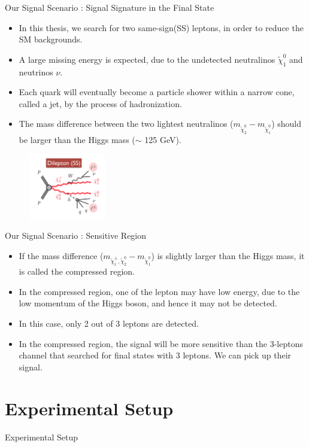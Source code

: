 \documentclass[mathserif,serif]{beamer}
\begin{document}
\begin{frame}{Our Signal Scenario : Signal Signature in the Final State}
\begin{itemize}
\item In this thesis, we search for two same-sign(SS) leptons, in order to reduce the SM backgrounds.
\item A large missing energy is expected, due to the undetected neutralinos $\tilde{\chi}_1^0$ and neutrinos $\nu$.
\item Each quark will eventually become a particle shower within a narrow cone, called a jet, by the process of hadronization.
\item The mass difference between the two lightest neutralinos ($m_{\tilde{\chi}_2^0} - m_{\tilde{\chi}_1^0}$) should be larger than the Higgs mass ($\sim$ 125 GeV).
\end{itemize}
\begin{figure}
\centering
\includegraphics[width=0.3\textwidth]{data/photo/theory/signal_feynman.png}
\end{figure}
\end{frame}

\begin{frame}{Our Signal Scenario : Sensitive Region}
\begin{itemize}
\item If the mass difference ($m_{\tilde{\chi}_1^\pm , \tilde{\chi}_2^0} - m_{\tilde{\chi}_1^0}$) is slightly larger than the Higgs mass, it is called the compressed region.
\item In the compressed region, one of the lepton may have low energy, due to the low momentum of the Higgs boson, and hence it may not be detected.
\item In this case, only 2 out of 3 leptons are detected.
\item In the compressed region, the signal will be more sensitive than the 3-leptons channel that searched for final states with 3 leptons. We can pick up their signal.
\end{itemize}
\end{frame}

\section{Experimental Setup}
\begin{frame}
\begin{center}
\huge
Experimental Setup
\end{center}
\end{frame}
\end{document}
